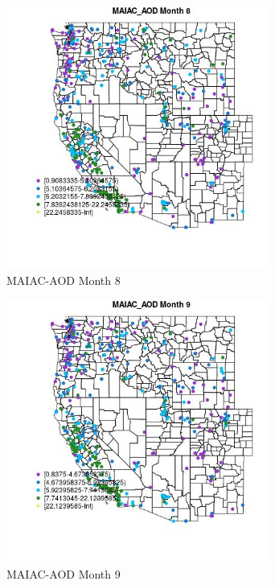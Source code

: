 \begin{figure} 
\centering  
\includegraphics[width=0.77\textwidth]{Code_Outputs/ML_input_report_ML_input_PM25_Step5_part_d_de_duplicated_aves_ML_input_MapObsMo8MAIAC_AOD.jpg} 
\caption{\label{fig:ML_input_report_ML_input_PM25_Step5_part_d_de_duplicated_aves_ML_inputMapObsMo8MAIAC_AOD}MAIAC-AOD Month 8} 
\end{figure} 
 

\begin{figure} 
\centering  
\includegraphics[width=0.77\textwidth]{Code_Outputs/ML_input_report_ML_input_PM25_Step5_part_d_de_duplicated_aves_ML_input_MapObsMo9MAIAC_AOD.jpg} 
\caption{\label{fig:ML_input_report_ML_input_PM25_Step5_part_d_de_duplicated_aves_ML_inputMapObsMo9MAIAC_AOD}MAIAC-AOD Month 9} 
\end{figure} 
 

